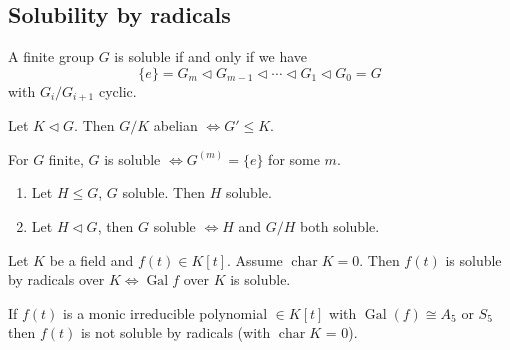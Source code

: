 \documentclass{article}
\DeclareMathOperator{\chara}{char}
\DeclareMathOperator{\Gal}{Gal}
\begin{document}
\subsection{Solubility by radicals}





















\begin{nlemma}\label{lem:4.16}
    A finite group $G$ is soluble if and only if we have
    \begin{equation*}
        \{e\} = G_m \lhd G_{m-1} \lhd \dotsb \lhd G_1 \lhd G_0 = G
    \end{equation*}
    with $G_i/G_{i+1}$ cyclic.
\end{nlemma}


\begin{nlemma}\label{lem:4.18}
    Let $K \lhd G$. Then $G/K$ abelian $\iff G' \leq K$.
\end{nlemma}



\begin{nlemma}\label{lem:4.20}
    For $G$ finite, $G$ is soluble $\iff G^{(m)} = \{e\}$ for some $m$.
\end{nlemma}

\begin{nlemma}\label{lem:4.21}\leavevmode
    \begin{enumerate}[label=(\roman*)]
        \item Let $H \leq G$, $G$ soluble. Then $H$ soluble.
        \item Let $H \lhd G$, then $G$ soluble $\iff H$ and $G/H$ both soluble.
    \end{enumerate}
\end{nlemma}


\begin{nthm}\label{thm:4.22}
    Let $K$ be a field and $f(t) \in K[t]$.
    Assume $\chara K= 0$. Then $f(t)$ is soluble by radicals over $K \iff \Gal f$ over $K$ is soluble.
\end{nthm}

\begin{ncor}\label{cor:4.23}
    If $f(t)$ is a monic irreducible polynomial $\in K[t]$ with $\Gal(f) \cong A_5$ or $S_5$ then $f(t)$ is not soluble by radicals (with $\chara K$ = 0).
\end{ncor}
\end{document}
